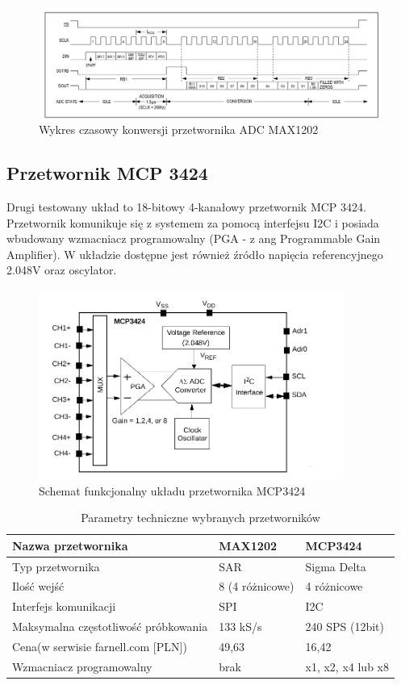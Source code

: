 \begin{figure}[h]
	\centering
		\includegraphics[width=14cm]{max1202time}
	\caption{Wykres czasowy konwersji przetwornika ADC MAX1202} 
	\label{fig:maxczasowy}
\end{figure}


\subsection{Przetwornik MCP 3424}

Drugi testowany układ to 18-bitowy 4-kanałowy przetwornik MCP 3424. Przetwornik komunikuje się z systemem za pomocą interfejsu I2C i posiada wbudowany wzmacniacz programowalny (PGA - z ang Programmable Gain Amplifier). W układzie dostępne jest również źródło napięcia referencyjnego 2.048V oraz oscylator.

\begin{figure}[h]
	\centering
		\includegraphics[width=10cm]{mcp3424_fun}
	\caption{Schemat funkcjonalny układu przetwornika MCP3424} 
	\label{fig:uxtouch}
\end{figure}


\begin{table}[t]
\label{tab3.1}
\begin{tabular}{|l|l|l|}

  \hline 
  Nazwa przetwornika & MAX1202 & MCP3424\\
  \hline
  Typ przetwornika & SAR & Sigma Delta\\
  \hline
  Ilość wejść & 8 (4 różnicowe)  & 4 różnicowe \\
  \hline 
  Interfejs komunikacji & SPI & I2C\\
  \hline
  Maksymalna częstotliwość próbkowania & 133 kS/s & 240 SPS (12bit) \\
  \hline
  Cena(w serwisie farnell.com [PLN]) & 49,63 & 16,42 \\
  \hline
  Wzmacniacz programowalny & brak & x1, x2, x4 lub x8 \\
  \hline
  
\end{tabular}
\caption{Parametry techniczne wybranych przetworników} 
\end{table}


